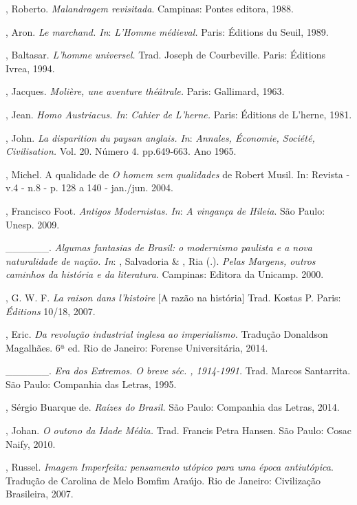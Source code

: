 \begin{Parskip}
, Roberto. \emph{Malandragem revisitada}. Campinas: Pontes editora, 1988.

, Aron. \emph{Le marchand. In}: \emph{L'Homme médieval.}
Paris: Éditions du Seuil, 1989.

, Baltasar. \emph{L'homme universel.} Trad. Joseph de
Courbeville. Paris: Éditions Ivrea, 1994.

, Jacques. \emph{Molière, une aventure théâtrale.} Paris:
Gallimard, 1963.

, Jean. \emph{Homo Austriacus. In}: \emph{Cahier de L'herne.}
Paris: Éditions de L'herne, 1981.

, John. \emph{La disparition du paysan anglais. In}:
\emph{Annales, Économie, Société, Civilisation.} Vol. 20. Número 4.
pp.649-663. Ano 1965.

, Michel. A qualidade de \emph{O homem sem qualidades} de Robert Musil.
In: Revista  - v.4 - n.8 - p. 128 a 140 - jan./jun. 2004.

, Francisco Foot. \emph{Antigos Modernistas.} \emph{In}: \emph{A
vingança de Hileia}. São Paulo: Unesp. 2009.

\_\_\_\_\_\_. \emph{Algumas fantasias de Brasil: o modernismo paulista e
a nova naturalidade de nação. In}: , Salvadoria \& , Ria (.). \emph{Pelas Margens, outros caminhos da história e da literatura}.
Campinas: Editora da Unicamp. 2000.

, G. W. F. \emph{La raison dans l'histoire} [A razão na
história] Trad. Kostas P. Paris: \emph{Éditions} 10/18, 2007.

, Eric. \emph{Da revolução industrial inglesa ao
imperialismo.} Tradução Donaldson Magalhães. 6ª ed. Rio de Janeiro:
Forense Universitária, 2014.

\_\_\_\_\_\_. \emph{Era dos Extremos. O breve séc. , 1914-1991.}
Trad. Marcos Santarrita. São Paulo: Companhia das Letras, 1995.

, Sérgio Buarque de. \emph{Raízes do Brasil.} São Paulo: Companhia
das Letras, 2014.

, Johan. \emph{O outono da Idade Média.} Trad. Francis Petra
Hansen. São Paulo: Cosac Naify, 2010.

, Russel. \emph{Imagem Imperfeita: pensamento utópico para uma
época antiutópica}. Tradução de Carolina de Melo Bomfim Araújo.
Rio de Janeiro: Civilização Brasileira, 2007.


\end{Parskip}
